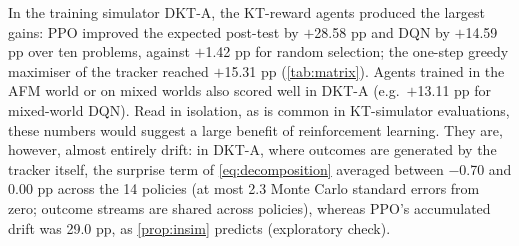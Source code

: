 \documentclass[a4paper,preprint,12pt,authoryear]{elsarticle}
\begin{document}
In the training simulator DKT-A, the KT-reward agents produced the largest gains: PPO improved the expected post-test by $+$28.58 pp and DQN by $+$14.59 pp over ten problems, against $+$1.42 pp for random selection; the one-step greedy maximiser of the tracker reached $+$15.31 pp (\cref{tab:matrix}). Agents trained in the AFM world or on mixed worlds also scored well in DKT-A (e.g.\ $+$13.11 pp for mixed-world DQN). Read in isolation, as is common in KT-simulator evaluations, these numbers would suggest a large benefit of reinforcement learning. They are, however, almost entirely drift: in DKT-A, where outcomes are generated by the tracker itself, the surprise term of \cref{eq:decomposition} averaged between $-$0.70 and 0.00 pp across the 14 policies (at most 2.3 Monte Carlo standard errors from zero; outcome streams are shared across policies), whereas PPO's accumulated drift was 29.0 pp, as \cref{prop:insim} predicts (exploratory check).
\end{document}
